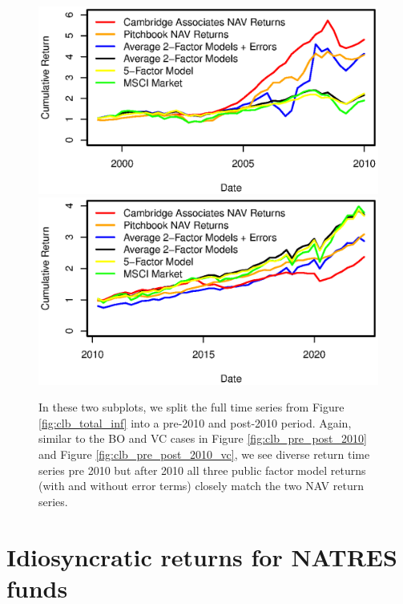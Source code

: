 \begin{figure}[H]
	\centering
	\includegraphics{Figures/XTotalErrorSeriesINFpre2010}
	\includegraphics{Figures/XTotalErrorSeriesINFpost2010}
	\caption{
		In these two subplots, we split the full time series from Figure \ref{fig:clb_total_inf} into a pre-2010 and post-2010 period.
		Again, similar to the BO and VC cases in Figure \ref{fig:clb_pre_post_2010} and  Figure \ref{fig:clb_pre_post_2010_vc}, we see diverse return time series pre 2010 but after 2010 all three public factor model returns (with and without error terms) closely match the two NAV return series.
	}
	\label{fig:clb_pre_post_2010_inf}
\end{figure}


\section{Idiosyncratic returns for NATRES funds}
\label{sec:natres_errors}


